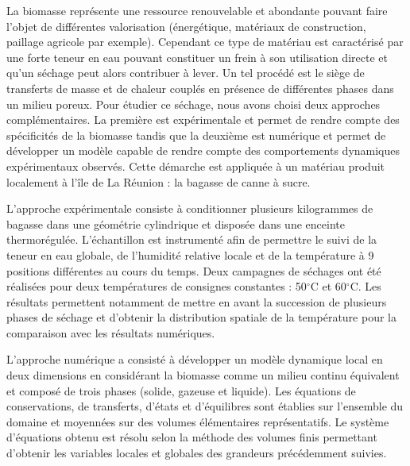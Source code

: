 {\normalsize
La biomasse représente une ressource renouvelable et abondante pouvant faire l'objet de différentes valorisation (énergétique, matériaux de construction, paillage agricole par exemple). Cependant ce type de matériau est caractérisé par une forte teneur en eau pouvant constituer un frein à son utilisation directe et qu'un séchage peut alors contribuer à lever. Un tel procédé est le siège de transferts de masse et de chaleur couplés en présence de différentes phases dans un milieu poreux. Pour étudier ce séchage, nous avons choisi deux approches complémentaires. La première est expérimentale et permet de rendre compte des spécificités de la biomasse tandis que la deuxième est numérique et permet de développer un modèle capable de rendre compte des comportements dynamiques expérimentaux observés. Cette démarche est appliquée à un matériau produit localement à l'île de La Réunion : la bagasse de canne à sucre.







L'approche expérimentale consiste à conditionner plusieurs kilogrammes de bagasse dans une géométrie cylindrique et disposée dans une enceinte thermorégulée. L'échantillon est instrumenté afin de permettre le suivi de la teneur en eau globale, de l'humidité relative locale et de la température à 9 positions différentes au cours du temps. Deux campagnes de séchages ont été réalisées pour deux températures de consignes constantes : 50$^{\circ}$C et 60$^{\circ}$C. Les résultats permettent notamment de mettre en avant la succession de plusieurs phases de séchage et d'obtenir la distribution spatiale de la température pour la comparaison avec les résultats numériques.







L'approche numérique a consisté à développer un modèle dynamique local en deux dimensions en considérant la biomasse comme un milieu continu équivalent et composé de trois phases (solide, gazeuse et liquide). Les équations de conservations, de transferts, d'états et d'équilibres sont établies sur l'ensemble du domaine et moyennées sur des volumes élémentaires représentatifs. Le système d'équations obtenu est résolu selon la méthode des volumes finis permettant d'obtenir les variables locales et globales des grandeurs précédemment suivies.







}
